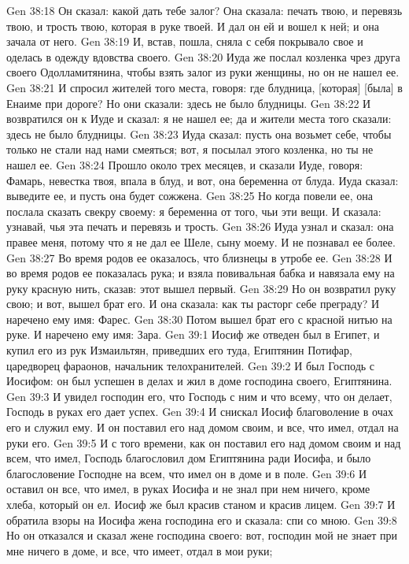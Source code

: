 Gen 38:18  Он сказал: какой дать тебе залог? Она сказала: печать твою, и перевязь твою, и трость твою, которая в руке твоей. И дал он ей и вошел к ней; и она зачала от него.
Gen 38:19  И, встав, пошла, сняла с себя покрывало свое и оделась в одежду вдовства своего.
Gen 38:20  Иуда же послал козленка чрез друга своего Одолламитянина, чтобы взять залог из руки женщины, но он не нашел ее.
Gen 38:21  И спросил жителей того места, говоря: где блудница, [которая] [была] в Енаиме при дороге? Но они сказали: здесь не было блудницы.
Gen 38:22  И возвратился он к Иуде и сказал: я не нашел ее; да и жители места того сказали: здесь не было блудницы.
Gen 38:23  Иуда сказал: пусть она возьмет себе, чтобы только не стали над нами смеяться; вот, я посылал этого козленка, но ты не нашел ее.
Gen 38:24  Прошло около трех месяцев, и сказали Иуде, говоря: Фамарь, невестка твоя, впала в блуд, и вот, она беременна от блуда. Иуда сказал: выведите ее, и пусть она будет сожжена.
Gen 38:25  Но когда повели ее, она послала сказать свекру своему: я беременна от того, чьи эти вещи. И сказала: узнавай, чья эта печать и перевязь и трость.
Gen 38:26  Иуда узнал и сказал: она правее меня, потому что я не дал ее Шеле, сыну моему. И не познавал ее более.
Gen 38:27  Во время родов ее оказалось, что близнецы в утробе ее.
Gen 38:28  И во время родов ее показалась рука; и взяла повивальная бабка и навязала ему на руку красную нить, сказав: этот вышел первый.
Gen 38:29  Но он возвратил руку свою; и вот, вышел брат его. И она сказала: как ты расторг себе преграду? И наречено ему имя: Фарес.
Gen 38:30  Потом вышел брат его с красной нитью на руке. И наречено ему имя: Зара.
Gen 39:1  Иосиф же отведен был в Египет, и купил его из рук Измаильтян, приведших его туда, Египтянин Потифар, царедворец фараонов, начальник телохранителей.
Gen 39:2  И был Господь с Иосифом: он был успешен в делах и жил в доме господина своего, Египтянина.
Gen 39:3  И увидел господин его, что Господь с ним и что всему, что он делает, Господь в руках его дает успех.
Gen 39:4  И снискал Иосиф благоволение в очах его и служил ему. И он поставил его над домом своим, и все, что имел, отдал на руки его.
Gen 39:5  И с того времени, как он поставил его над домом своим и над всем, что имел, Господь благословил дом Египтянина ради Иосифа, и было благословение Господне на всем, что имел он в доме и в поле.
Gen 39:6  И оставил он все, что имел, в руках Иосифа и не знал при нем ничего, кроме хлеба, который он ел. Иосиф же был красив станом и красив лицем.
Gen 39:7  И обратила взоры на Иосифа жена господина его и сказала: спи со мною.
Gen 39:8  Но он отказался и сказал жене господина своего: вот, господин мой не знает при мне ничего в доме, и все, что имеет, отдал в мои руки;
